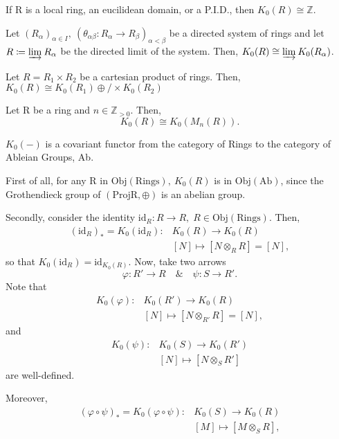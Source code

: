 \documentclass[../category_theory.tex]{subfiles}
\begin{document}
\begin{example}
	If R is a local ring, an eucilidean domain, or a P.I.D., then \(K_{0}(R)\cong \mathbb{Z}.\)
\end{example}
\begin{prop*}
	Let \((R_{\alpha })_{\alpha \in I}, \: (\theta_{\alpha \beta }:R_{\alpha }\rightarrow R_{\beta })_{\alpha <\beta }\) be a directed system of rings and let \(R\coloneqq \varinjlim_{}R_{\alpha }\) be the directed limit of the system. Then, \(K_{0}(R)\cong \varinjlim_{}K_{0}(R_{\alpha })\).
\end{prop*}
\begin{prop*}
	Let \(R = R_1\times R_2\) be a cartesian product of rings. Then, \(K_{0}(R)\cong K_{0}(R_1)\oplus / \times K_{0}(R_2)\)
\end{prop*}
\begin{theorem*}
	Let R be a ring and \(n\in \mathbb{Z}_{>0}\). Then,
	\[
		K_{0}(R) \cong K_{0}(M_{n}(R)).
	\]
\end{theorem*}
\begin{prop*}
	\(K_{0}(-)\) is a covariant functor from the category of Rings to the category of Ableian Groups, Ab.
\end{prop*}
\begin{proof*}
	First of all, for any R in \(\mathrm{Obj}(\mathrm{Rings}),\: K_{0}(R)\) is in \(\mathrm{Obj}(\mathrm{Ab})\), since the Grothendieck group of \((\mathrm{Proj R}, \oplus)\) is an abelian group.

	Secondly, consider the identity \(\mathrm{id}_R:R\rightarrow R, \; R\in \mathrm{Obj}(\mathrm{Rings})\). Then,
	\begin{align*}
		(\mathrm{id}_{R})_{*}=K_{0}(\mathrm{id}_{R}): & K_{0}(R)\rightarrow K_{0}(R)      \\
		                                              & [N]\mapsto [N\otimes_{R}R] = [N],
	\end{align*}
	so that \(K_{0}(\mathrm{id}_{R}) = \mathrm{id}_{K_{0}(R)}\). Now, take two arrows
	\[
		\varphi :R'\rightarrow R\quad\&\quad \psi:S\rightarrow R'.
	\]
	Note that
	\begin{align*}
		K_{0}(\varphi ): & K_{0}(R')\rightarrow K_{0}(R)      \\
		                 & [N]\mapsto [N\otimes_{R'}R] = [N],
	\end{align*}
	and
	\begin{align*}
		K_{0}(\psi): & K_{0}(S)\rightarrow K_{0}(R') \\
		             & [N]\mapsto [N\otimes_{S}R']
	\end{align*}
	are well-defined.

	Moreover,
	\begin{align*}
		(\varphi\circ \psi)_{*}=K_{0}(\varphi \circ \psi): & K_{0}(S)\rightarrow K_{0}(R) \\
		                                                   & [M]\mapsto [M\otimes_{S}R],
	\end{align*}
\end{proof*}
\end{document}
